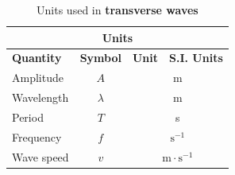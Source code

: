 \begin{table}[H]
\begin{center}
\begin{tabular}{|l|c|c|c|}\hline \hline 
\multicolumn{4}{|c|}{\textbf{Units}}\\ \hline \hline
\textbf{Quantity} & \textbf{Symbol} & \textbf{Unit} & \textbf{S.I. Units}\\ \hline
Amplitude & $A$ & \multicolumn{2}{c|}{m} \\ \hline
Wavelength & $\lambda$ & \multicolumn{2}{c|}{m}  \\ \hline
Period & $T$ & \multicolumn{2}{c|}{s}  \\ \hline
Frequency & $f$ & \multicolumn{2}{c|}{$\text{s}^{-1}$}  \\ \hline
Wave speed & $v$ & \multicolumn{2}{c|}{$\text{m} \cdot \text{s}^{-1}$} \\ \hline
\end{tabular}
\end{center}
\caption{Units used in \textbf{transverse waves} }
\label{table:electricity::units}
\end{table}
